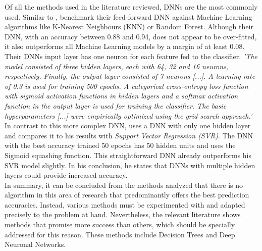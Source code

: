 Of all the methods used in the literature reviewed, DNNs are the most commonly used. Similar to \citet{deng_analysis_2020}, \citet{bhateja_analysis_2021} benchmark their feed-forward DNN against Machine Learning algorithms like K-Nearest Neighbours (KNN) or Random Forest. Although their DNN, with an accuracy between 0.88 and 0.94, does not appear to be over-fitted, it also outperforms all Machine Learning models by a margin of at least 0.08. Their DNNs input layer has one neuron for each feature fed to the classifier. \emph{'The model consisted of three hidden layers, each with 64, 32 and 16 neurons, respectively. Finally, the output layer consisted of 7 neurons [...]. A learning rate of 0.3 is used for training 500 epochs. A categorical cross-entropy loss function with sigmoid activation functions in hidden layers and a softmax activation function in the output layer is used for training the classifier. The basic hyperparameters [...] were empirically optimized using the grid search approach.'} \parencite[, p. 7]{bhateja_analysis_2021} In contrast to this more complex DNN, \citet{lutz_fantasy_2015} uses a DNN with only one hidden layer and compares it to his results with \emph{Support Vector Regression (SVR)}. The DNN with the best accuracy trained 50 epochs has 50 hidden units and uses the Sigmoid squashing function. This straightforward DNN already outperforms his SVR model slightly. In his conclusion, he states that DNNs with multiple hidden layers could provide increased accuracy. \parencite[cf.][, p. 5]{lutz_fantasy_2015} \\
\indent In summary, it can be concluded from the methods analyzed that there is no algorithm in this area of research that predominantly offers the best prediction accuracies. Instead, various methods must be experimented with and adapted precisely to the problem at hand. Nevertheless, the relevant literature shows methods that promise more success than others, which should be specially addressed for this reason. These methods include Decision Trees and Deep Neuronal Networks.

